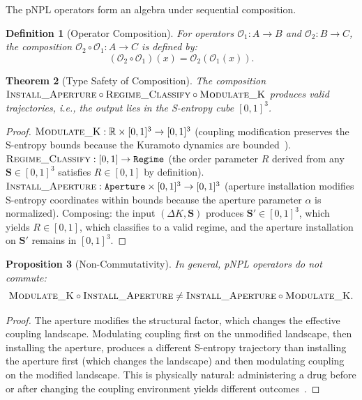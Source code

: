 \documentclass[10pt,twocolumn]{article}
\newtheorem{theorem}{Theorem}[section]
\newtheorem{definition}[theorem]{Definition}
\newtheorem{proposition}[theorem]{Proposition}
\theoremstyle{remark}
\newcommand{\Scoord}{\mathbf{S}}
\begin{document}
The pNPL operators form an algebra under sequential composition.

\begin{definition}[Operator Composition]
\label{def:composition}
For operators $\mathcal{O}_1: A \to B$ and $\mathcal{O}_2: B \to C$, the composition $\mathcal{O}_2 \circ \mathcal{O}_1: A \to C$ is defined by:
\begin{equation}
(\mathcal{O}_2 \circ \mathcal{O}_1)(x) = \mathcal{O}_2(\mathcal{O}_1(x)).
\end{equation}
\end{definition}

\begin{theorem}[Type Safety of Composition]
\label{thm:type_safe}
The composition $\textsc{Install\_Aperture} \circ \textsc{Regime\_Classify} \circ \textsc{Modulate\_K}$ produces valid trajectories, i.e., the output lies in the S-entropy cube $[0,1]^3$.
\end{theorem}

\begin{proof}
$\textsc{Modulate\_K}: \mathbb{R} \times [0,1]^3 \to [0,1]^3$ (coupling modification preserves the S-entropy bounds because the Kuramoto dynamics are bounded~\cite{acebron2005kuramoto}). $\textsc{Regime\_Classify}: [0,1] \to \texttt{Regime}$ (the order parameter $R$ derived from any $\Scoord \in [0,1]^3$ satisfies $R \in [0,1]$ by definition). $\textsc{Install\_Aperture}: \texttt{Aperture} \times [0,1]^3 \to [0,1]^3$ (aperture installation modifies S-entropy coordinates within bounds because the aperture parameter $\alpha$ is normalized). Composing: the input $(\Delta K, \Scoord)$ produces $\Scoord' \in [0,1]^3$, which yields $R \in [0,1]$, which classifies to a valid regime, and the aperture installation on $\Scoord'$ remains in $[0,1]^3$.
\end{proof}

\begin{proposition}[Non-Commutativity]
\label{prop:noncommute}
In general, pNPL operators do not commute:
\begin{equation}
\textsc{Modulate\_K} \circ \textsc{Install\_Aperture} \neq \textsc{Install\_Aperture} \circ \textsc{Modulate\_K}.
\end{equation}
\end{proposition}

\begin{proof}
The aperture modifies the structural factor, which changes the effective coupling landscape. Modulating coupling first on the unmodified landscape, then installing the aperture, produces a different S-entropy trajectory than installing the aperture first (which changes the landscape) and then modulating coupling on the modified landscape. This is physically natural: administering a drug before or after changing the coupling environment yields different outcomes~\cite{stahl2013psychopharmacology}.
\end{proof}
\end{document}
